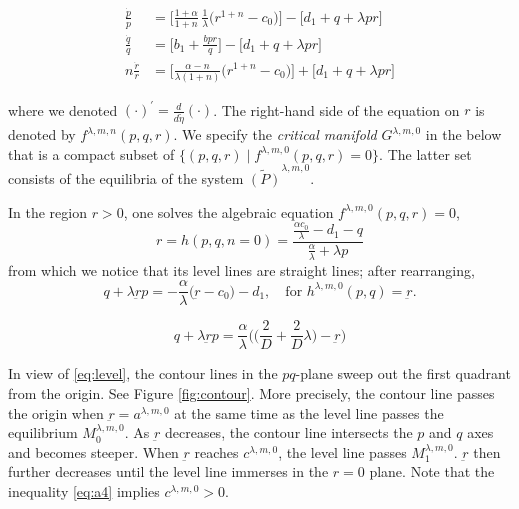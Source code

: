 \documentclass[a4paper,11pt]{article}
\def\dpp{\dot{p}}
\def\dqq{\dot{q}}
\def\drr{\dot{r}}
\begin{document}
\begin{align*}
 \frac{\dpp}{p}&=\Big[\frac{1+\alpha}{1+n}\,\frac{1}{\lambda }\Big(r^{1+n}-c_0\Big)\Big] -\Big[d_1 + q + \lambda pr\Big]\\
 \frac{\dqq}{q}&=\Big[b_1 +\frac{bpr}{q}\Big] -\Big[d_1 + q + \lambda pr\Big]\\
 n\frac{\drr}{r}&=\Big[\frac{\alpha-n}{\lambda(1+n)}\Big(r^{1+n}-c_0\Big)\Big]+\Big[d_1 + q + \lambda pr\Big]
\end{align*}

\noindent where we denoted $(\cdot)^\prime = \frac{d}{d\tilde{\eta}}(\cdot)$.
The right-hand side of the equation on $r$ is denoted by $f^{\lambda,m,n}(p,q,r)$. We specify the {\it critical manifold} $G^{\lambda,m,0}$ in the below that is a compact subset of $\{(p,q,r)\;|\; f^{\lambda,m,0}(p,q,r)=0\}$. The latter set consists of the equilibria of the system $\tilde{(P)}^{\lambda,m,0}$.

In the region $r>0$, one solves the algebraic equation $f^{\lambda,m,0}(p,q,r)=0$,
\begin{equation}\label{eq:hn0}
 r=h(p,q,n=0) = \frac{ \frac{\alpha c_0}{\lambda} - d_1 -q }{ \frac{\alpha}{\lambda} + \lambda p}
\end{equation}
from which we notice that its level lines are straight lines; after rearranging,
\begin{equation}
 q + \lambda \underbar{r}p =  -\frac{\alpha}{\lambda} \big( \underbar{r} - c_0\big)-d_1, \quad \text{for  $h^{\lambda,m,0}(p,q)=\underbar{r}$.} \label{eq:level}
\end{equation}

\begin{equation}
 q + \lambda \underbar{r}p =  \frac{\alpha}{\lambda} \Big( \big(\frac{2}{D} + \frac{2}{D}\lambda\big) - \underbar{r} \Big)
\end{equation}

In view of \eqref{eq:level}, the contour lines in the $pq$-plane sweep out the first quadrant from the origin. See Figure \ref{fig:contour}. More precisely, the contour line passes the origin when $\underbar{r}=a^{ \lambda,m,0}$ at the same time as the level line passes the equilibrium $M_0^{ \lambda,m,0}$. As $\underbar{r}$ decreases, the contour line intersects the $p$ and $q$ axes and becomes steeper. When $\underbar{r}$ reaches $c^{ \lambda,m,0}$, the level line passes $M_1^{ \lambda,m,0}$. $\underbar{r}$ then further decreases until the level line immerses in the $r=0$ plane. Note that the inequality \eqref{eq:a4} implies $c^{ \lambda,m,0}>0$.
\end{document}

